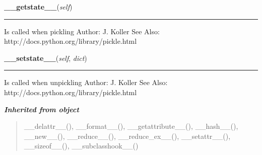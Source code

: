     \label{spacepy:spacetime:SpaCo:__getstate__}

    \vspace{0.5ex}

\hspace{.8\funcindent}\begin{boxedminipage}{\funcwidth}

    \raggedright \textbf{\_\_getstate\_\_}(\textit{self})

    \vspace{-1.5ex}

    \rule{\textwidth}{0.5\fboxrule}
\setlength{\parskip}{2ex}
    Is called when pickling Author: J. Koller See Also: 
    http://docs.python.org/library/pickle.html

\setlength{\parskip}{1ex}
    \end{boxedminipage}

    \label{spacepy:spacetime:SpaCo:__setstate__}

    \vspace{0.5ex}

\hspace{.8\funcindent}\begin{boxedminipage}{\funcwidth}

    \raggedright \textbf{\_\_setstate\_\_}(\textit{self}, \textit{dict})

    \vspace{-1.5ex}

    \rule{\textwidth}{0.5\fboxrule}
\setlength{\parskip}{2ex}
    Is called when unpickling Author: J. Koller See Also: 
    http://docs.python.org/library/pickle.html

\setlength{\parskip}{1ex}
    \end{boxedminipage}


\large{\textbf{\textit{Inherited from object}}}

\begin{quote}
\_\_delattr\_\_(), \_\_format\_\_(), \_\_getattribute\_\_(), \_\_hash\_\_(), \_\_new\_\_(), \_\_reduce\_\_(), \_\_reduce\_ex\_\_(), \_\_setattr\_\_(), \_\_sizeof\_\_(), \_\_subclasshook\_\_()
\end{quote}

